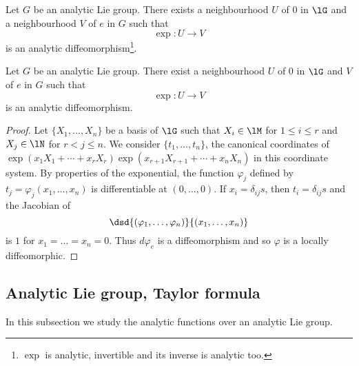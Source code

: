 \begin{proposition}     \label{PROPooAICDooQcmPZB}
    Let \( G\) be an analytic Lie group. There exists a neighbourhood \( U\) of \( 0\) in \( \lG\) and a neighbourhood \( V\) of \( e\) in \( G\) such that
    \begin{equation}
        \exp\colon U\to V
    \end{equation}
    is an analytic diffeomorphism\footnote{\( \exp\) is analytic, invertible and its inverse is analytic too.}.
\end{proposition}

\begin{theorem}     \label{THOooFMFLooCnLJPr}
    Let \( G\) be an analytic Lie group. There exist a neighbourhood \( U\) of \( 0\) in \( \lG\) and \( V\) of \( e\) in \( G\) such that
    \begin{equation}
        \exp\colon U\to V
    \end{equation}
    is an analytic diffeomorphism.
\end{theorem}

\begin{proof}
    Let $\{X_1,\ldots,X_n\}$ be a basis of $\lG$ such that $X_i\in\lM$ for $1\leq i\leq r$ and $X_j\in\lN$ for $r<j\leq n$. We consider $\{t_1,\ldots,t_n\}$, the canonical coordinates of $\exp(x_1X_1+\cdots+x_rX_r)\exp(x_{r+1}X_{r+1}+\cdots+x_nX_n)$ in this coordinate system. By properties of the exponential, the function $\varphi_j$ defined by $t_j=\varphi_j(x_1,\ldots,x_n)$ is differentiable at $(0,\ldots,0)$. If $x_i=\delta_{ij}s$, then $t_i=\delta_{ij}s$ and the Jacobian of
    \[
    \dsd{(\varphi_1,\ldots,\varphi_n)}{(x_1,\ldots,x_n)}
    \]
    is $1$ for $x_1=\ldots=x_n=0$. Thus $d\varphi_e$ is a diffeomorphism and so $\varphi$ is a locally diffeomorphic.
\end{proof}


\subsection{Analytic Lie group, Taylor formula}

In this subsection we study the analytic functions over an analytic Lie group.

